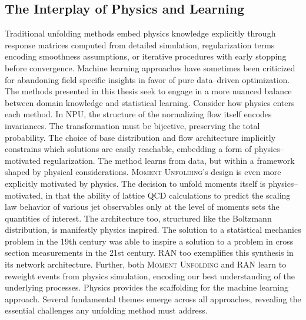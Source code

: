     \subsection{The Interplay of Physics and Learning}
        Traditional unfolding methods embed physics knowledge explicitly through response matrices computed from detailed simulation, regularization terms encoding smoothness assumptions, or iterative procedures with early stopping before convergence.
        Machine learning approaches have sometimes been criticized for abandoning field specific insights in favor of pure data--driven optimization.
        The methods presented in this thesis seek to engage in a more nuanced balance between domain knowledge and statistical learning.
        Consider how physics enters each method. In NPU, the structure of the normalizing flow itself encodes invariances. The transformation must be bijective, preserving the total probability. The choice of base distribution and flow architecture implicitly constrains which solutions are easily reachable, embedding a form of physics--motivated regularization.
        The method learns from data, but within a framework shaped by physical considerations.
        \textsc{Moment Unfolding}'s design is even more explicitly motivated by physics.
        The decision to unfold moments itself is physics--motivated, in that the ability of lattice QCD calculations to predict the scaling law behavior of various jet observables only at the level of moments sets the quantities of interest.
        The architecture too, structured like the Boltzmann distribution, is manifestly physics inspired.
        The solution to a statistical mechanics problem in the 19th century was able to inspire a solution to a problem in cross section measurements in the 21st century.
        RAN too exemplifies this synthesis in its network architecture.
        Further, both \textsc{Moment Unfolding} and RAN learn to reweight events from physics simulation, encoding our best understanding of the underlying processes.
        Physics provides the scaffolding for the machine learning approach.
        Several fundamental themes emerge across all approaches, revealing the essential challenges any unfolding method must address.
    
